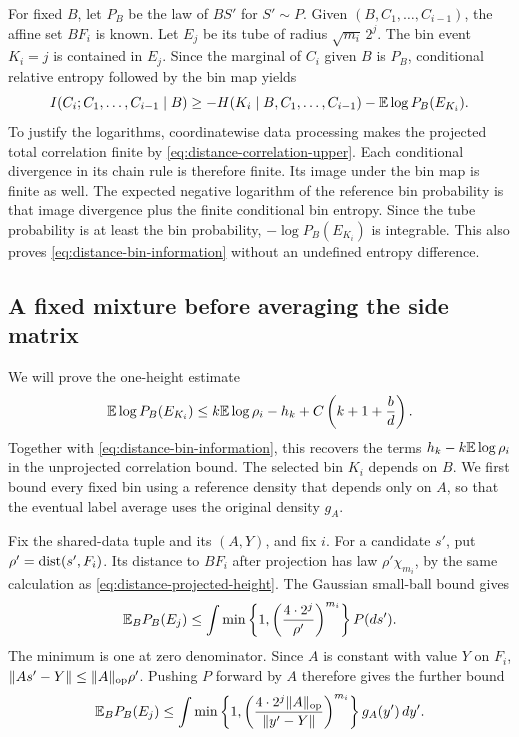 For fixed $B$, let $P_B$ be the law of $BS'$ for $S'\sim P$. Given
$(B,C_1,\ldots,C_{i-1})$, the affine set $BF_i$ is known. Let $E_j$ be its
tube of radius $\sqrt{m_i}\,2^j$. The bin event $K_i=j$ is contained in
$E_j$. Since the marginal of $C_i$ given $B$ is $P_B$, conditional relative
entropy followed by the bin map yields
\begin{equation}\label{eq:distance-bin-information}
 I(C_i;C_1,\ldots,C_{i-1}\mid B)
 \ge-H(K_i\mid B,C_1,\ldots,C_{i-1})-\mathbb E\log P_B(E_{K_i}).
\end{equation}
To justify the logarithms, coordinatewise data processing makes the
projected total correlation finite by
\eqref{eq:distance-correlation-upper}. Each conditional divergence in its
chain rule is therefore finite. Its image under the bin map is finite as
well. The expected negative logarithm of the reference bin probability is
that image divergence plus the finite conditional bin entropy. Since the
tube probability is at least the bin probability,
$-\log P_B(E_{K_i})$ is integrable. This also proves
\eqref{eq:distance-bin-information} without an undefined entropy difference.

\subsection{A fixed mixture before averaging the side matrix}

We will prove the one-height estimate
\begin{equation}\label{eq:distance-tube-goal}
 \mathbb E\log P_B(E_{K_i})
 \le k\mathbb E\log\rho_i-h_k+C\left(k+1+\frac bd\right).
\end{equation}
Together with \eqref{eq:distance-bin-information}, this recovers the
terms $h_k-k\mathbb E\log\rho_i$ in the unprojected correlation bound.
The selected bin $K_i$ depends on $B$. We first bound every fixed bin
using a reference density that depends only on $A$, so that the eventual
label average uses the original density $g_A$.

Fix the shared-data tuple and its $(A,Y)$, and fix $i$. For a candidate
$s'$, put $\rho'=\operatorname{dist}(s',F_i)$. Its distance to $BF_i$ after projection
has law $\rho'\chi_{m_i}$, by the same calculation as
\eqref{eq:distance-projected-height}. The Gaussian small-ball bound gives
\[
 \mathbb E_B P_B(E_j)
 \le\int\min\left\{1,\left(\frac{4\cdot2^j}{\rho'}\right)^{m_i}\right\}P(ds').
\]
The minimum is one at zero denominator. Since $A$ is constant with value
$Y$ on $F_i$,
$\lVert As'-Y\rVert\le\lVert A\rVert_{\mathrm{op}}\rho'$. Pushing $P$ forward by $A$ therefore
gives the further bound
\begin{equation}\label{eq:distance-tube-kernel}
 \mathbb E_B P_B(E_j)
 \le\int\min\left\{1,
       \left(\frac{4\cdot2^j\lVert A\rVert_{\mathrm{op}}}{\lVert y'-Y\rVert}\right)^{m_i}\right\}
       g_A(y')\,dy'.
\end{equation}

